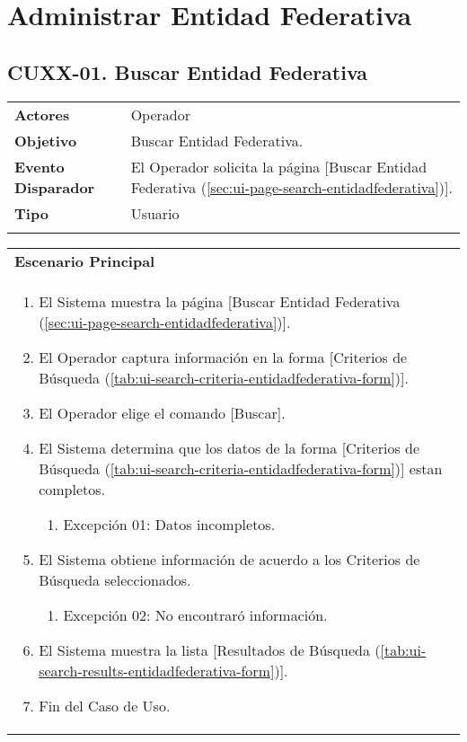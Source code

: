 \clearpage
\section{Administrar Entidad Federativa} \label{sec:cf-uc-admin-entidadfederativa}

\subsection{CUXX-01. Buscar Entidad Federativa} \label{sec:cu-search-EntidadFederativa}

\begin{tabular}{ p{3.5cm} p{11.5cm} }
	\textbf{Actores} & Operador\\
	\textbf{Objetivo} & Buscar Entidad Federativa.\\
	\textbf{Evento Disparador} & El Operador solicita la página [Buscar Entidad Federativa (\ref{sec:ui-page-search-entidadfederativa})].\\
	\textbf{Tipo} & Usuario\\
	\\
\end{tabular}

\begin{tabular}{ p{15.5cm} }
	\textbf{Escenario Principal} \\
	\begin{enumerate}
		\item El Sistema muestra la página [Buscar Entidad Federativa (\ref{sec:ui-page-search-entidadfederativa})].
		\item El Operador captura información en la forma [Criterios de Búsqueda (\ref{tab:ui-search-criteria-entidadfederativa-form})].
		\item El Operador elige el comando [Buscar].
		\item El Sistema determina que los datos de la forma [Criterios de Búsqueda (\ref{tab:ui-search-criteria-entidadfederativa-form})] estan completos.
			\begin{enumerate}
				\item Excepción 01: Datos incompletos.
			\end{enumerate}
		\item El Sistema obtiene información de acuerdo a los Criterios de Búsqueda seleccionados.
			\begin{enumerate}
				\item Excepción 02: No encontraró información.
			\end{enumerate}
		\item El Sistema muestra la lista [Resultados de Búsqueda (\ref{tab:ui-search-results-entidadfederativa-form})].
		\item Fin del Caso de Uso.
	\end{enumerate}
\end{tabular}

